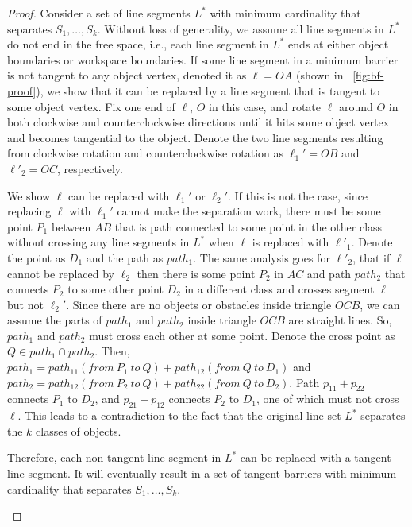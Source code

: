 \begin{proof}

Consider a set of line segments $L^*$ with minimum cardinality that separates $S_1,\dots, S_k$. 
Without loss of generality, we assume all line segments in $L^*$ do not end in the free space, i.e., each line segment in $L^*$ ends
at either object boundaries or workspace boundaries.
If some line segment in a minimum barrier is not tangent to any object vertex, denoted it as $\ell=OA$ (shown in ~\ref{fig:bf-proof}), 
we show that it can be replaced by a line segment that is tangent to some object vertex. 
%
Fix one end of $\ell$, $O$ in this case, and rotate $\ell$ around $O$ in both clockwise and counterclockwise directions until it hits some object vertex and becomes tangential to the object.
%
Denote the two line segments resulting from clockwise rotation and counterclockwise rotation as $\ell_1'=OB$ and $\ell'_2=OC$, respectively. 

We show $\ell$ can be replaced with $\ell_1'$ or $\ell_2'$. 
If this is not the case,
since replacing $\ell$ with $\ell_1'$ cannot make the separation work, there must be some point $P_1$ between $AB$ that is path connected to some point in the other class without crossing any line segments in $L^*$ when $\ell$ is replaced with $\ell'_1$. Denote the point as $D_1$ and the path as $path_1$. 
The same analysis goes for $\ell'_2$, that if $\ell$ cannot be replaced by $\ell_2$ then there is some point $P_2$ in $AC$ and path $path_2$ that connects $P_2$ to some other point $D_2$ in a different class and crosses segment $\ell$ but not $\ell_2'$. 
Since there are no objects or obstacles inside triangle $OCB$, we can assume the parts of $path_1$ and $path_2$ inside triangle $OCB$ are straight lines.
So, $path_1$ and $path_2$ must cross each other at some point. 
Denote the cross point as $Q\in path_1 \cap path_2$. 
Then, $path_1 = path_{11} (from\ P_1\ to\ Q) + path_{12} (from\ Q\ to\ D_1)$ and $path_2 = path_{12} (from\ P_2\ to\ Q) + path_{22} (from\ Q\ to\ D_2)$. 
Path $p_{11} + p_{22}$ connects $P_1$ to $D_2$, and $p_{21} + p_{12}$ connects $P_2$ to $D_1$, one of which must not cross $\ell$. 
This leads to a contradiction to the fact that the original line set $L^*$ separates the $k$ classes of objects.

Therefore, each non-tangent line segment in $L^*$ can be replaced with a tangent line segment. 
It will eventually result in a set of tangent barriers with minimum cardinality that separates $S_1,\dots,S_k$.
\begin{figure}[ht]
    \vspace{-2mm}
    \centering
{}
\end{figure}
\end{proof}
